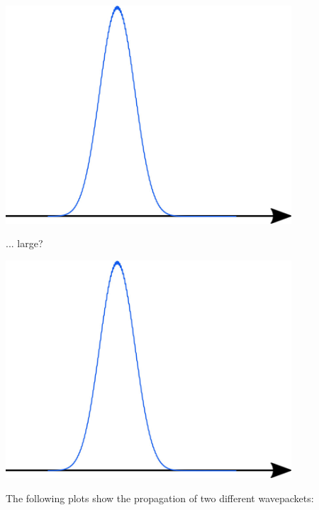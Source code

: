 \begin{questions}
\begin{minipage}{0.5\textwidth}
	\centerline{\includegraphics[width=0.8\textwidth]{includes/wavepackets-FIGURES/gaussian.jpg}}
	\end{minipage}
	\begin{minipage}{0.5\textwidth}
		\centerline{... large?}\vspace{0.1in}
		
	\centerline{\includegraphics[width=0.8\textwidth]{includes/wavepackets-FIGURES/gaussian.jpg}}
	\end{minipage}
	
	\vspace{0.3in}
	
	\contdnewpg

\question The following plots show the propagation of two different wavepackets:


\end{questions}
